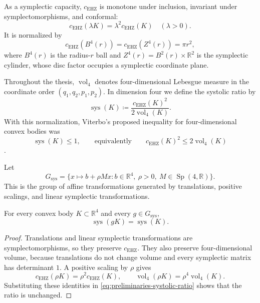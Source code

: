 As a symplectic capacity, \(c_{\mathrm{EHZ}}\) is monotone
under inclusion, invariant under symplectomorphisms, and conformal:
\[
  c_{\mathrm{EHZ}}(\lambda K)=\lambda^2c_{\mathrm{EHZ}}(K)
  \quad(\lambda>0).
\]
It is normalized by
\[
  c_{\mathrm{EHZ}}(B^4(r))=c_{\mathrm{EHZ}}(Z^4(r))=\pi r^2,
\]
where \(B^4(r)\) is the radius-\(r\) ball and
\(Z^4(r)=B^2(r)\times\mathbb{R}^2\) is the symplectic cylinder, whose
disc factor occupies a symplectic coordinate plane.

Throughout the thesis, \(\operatorname{vol}_4\) denotes four-dimensional
Lebesgue measure in the coordinate order \((q_1,q_2,p_1,p_2)\). In dimension
four we define the systolic ratio by
\begin{equation}\label{eq:preliminaries-systolic-ratio}
  \operatorname{sys}(K)
  \coloneqq
  \frac{c_{\mathrm{EHZ}}(K)^2}{2\operatorname{vol}_4(K)}.
\end{equation}
With this normalization, Viterbo's proposed inequality for four-dimensional convex
bodies was
\[
  \operatorname{sys}(K)\leq 1,
  \qquad\text{equivalently}\qquad
  c_{\mathrm{EHZ}}(K)^2\leq 2\operatorname{vol}_4(K)
\]
\cite{Viterbo2000}.

\begin{definition}
\label{def:preliminaries-systolic-ratio-symmetries}
Let
\[
  G_{\operatorname{sys}}
  =
  \{x\mapsto b+\rho Mx:
    b\in\mathbb R^4,\ \rho>0,\ M\in\operatorname{Sp}(4,\mathbb R)\}.
\]
This is the group of affine transformations generated by translations,
positive scalings, and linear symplectic transformations.
\end{definition}

\begin{lemma}
\label{lem:preliminaries-systolic-ratio-invariance}
For every convex body \(K\subset\mathbb R^4\) and every
\(g\in G_{\operatorname{sys}}\),
\[
  \operatorname{sys}(gK)=\operatorname{sys}(K).
\]
\end{lemma}

\begin{proof}
Translations and linear symplectic transformations are symplectomorphisms, so
they preserve \(c_{\mathrm{EHZ}}\). They also preserve four-dimensional
volume, because translations do not change volume and every symplectic matrix
has determinant \(1\). A positive scaling by \(\rho\) gives
\[
  c_{\mathrm{EHZ}}(\rho K)=\rho^2c_{\mathrm{EHZ}}(K),
  \qquad
  \operatorname{vol}_4(\rho K)=\rho^4\operatorname{vol}_4(K).
\]
Substituting these identities in
\eqref{eq:preliminaries-systolic-ratio} shows that the ratio is unchanged.
\end{proof}

